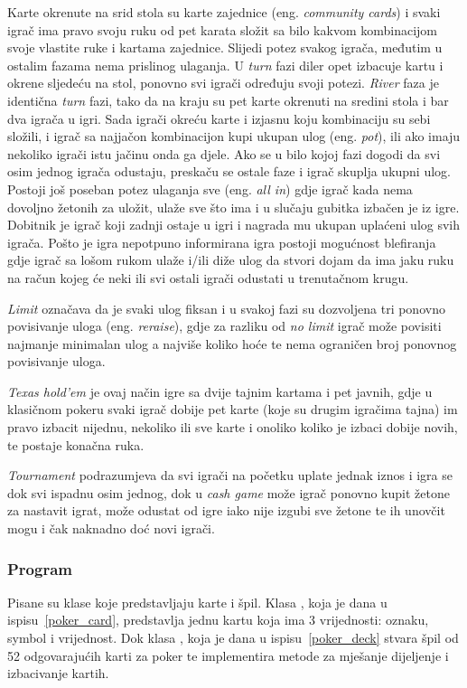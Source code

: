 Karte okrenute na srid stola su karte zajednice (eng. \textit{community cards}) i svaki igrač ima pravo svoju ruku od pet karata složit sa bilo kakvom kombinacijom svoje vlastite ruke i kartama zajednice. Slijedi potez svakog igrača, međutim u ostalim fazama nema prislinog ulaganja. U \emph{turn} fazi diler opet izbacuje kartu i okrene sljedeću na stol, ponovno svi igrači određuju svoji potezi. \emph{River} faza je identična \emph{turn} fazi, tako da na kraju su pet karte okrenuti na sredini stola i bar dva igrača u igri. Sada igrači okreću karte i izjasnu koju kombinaciju su sebi složili, i igrač sa najjačon kombinacijon kupi ukupan ulog (eng. \textit{pot}), ili ako imaju nekoliko igrači istu jačinu onda ga djele. Ako se u bilo kojoj fazi dogodi da svi osim jednog igrača odustaju, preskaču se ostale faze i igrač skuplja ukupni ulog. Postoji još poseban potez ulaganja sve (eng. \textit{all in}) gdje igrač kada nema dovoljno žetonih za uložit, ulaže sve što ima i u slučaju gubitka izbačen je iz igre. Dobitnik je igrač koji zadnji ostaje u igri i nagrada mu ukupan uplaćeni ulog svih igrača. Pošto je igra nepotpuno informirana igra postoji mogućnost blefiranja gdje igrač sa lošom rukom ulaže i/ili diže ulog da stvori dojam da ima jaku ruku na račun kojeg će neki ili svi ostali igrači odustati u trenutačnom krugu.


\emph{Limit} označava da je svaki ulog fiksan i u svakoj fazi su dozvoljena tri ponovno povisivanje uloga (eng. \textit{reraise}), gdje za razliku od \emph{no limit} igrač može povisiti najmanje minimalan ulog a najviše koliko hoće te nema ograničen broj ponovnog povisivanje uloga.

\emph{Texas hold'em} je ovaj način igre sa dvije tajnim kartama i pet javnih, gdje u klasičnom pokeru svaki igrač dobije pet karte (koje su drugim igračima tajna) im pravo izbacit nijednu, nekoliko ili sve karte i onoliko koliko je izbaci dobije novih, te postaje konačna ruka.

\emph{Tournament} podrazumjeva da svi igrači na početku uplate jednak iznos i igra se dok svi ispadnu osim jednog, dok u \emph{cash game} može igrač ponovno kupit žetone za nastavit igrat, može odustat od igre 
iako nije izgubi sve žetone te ih unovčit mogu i čak naknadno doć novi igrači.

\subsubsection{Program}
Pisane su klase koje predstavljaju karte i špil. Klasa , koja je dana u ispisu~\ref{poker_card}, predstavlja jednu kartu koja ima 3 vrijednosti: oznaku, symbol i vrijednost. Dok klasa , koja je dana u ispisu~\ref{poker_deck} stvara špil od 52 odgovarajućih karti za poker te implementira metode za mješanje dijeljenje i izbacivanje kartih.


